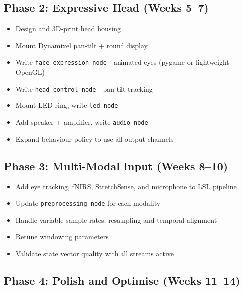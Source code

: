 \documentclass[11pt,a4paper]{article}
\begin{document}
\subsection{Phase 2: Expressive Head (Weeks 5--7)}

\begin{milestonebox}[title={Deliverable: Robot moves, looks at you, changes expression and LEDs based on state}]
\begin{itemize}[leftmargin=1.5em, nosep]
  \item Design and 3D-print head housing
  \item Mount Dynamixel pan-tilt + round display
  \item Write \texttt{face\_expression\_node}---animated eyes (pygame or lightweight OpenGL)
  \item Write \texttt{head\_control\_node}---pan-tilt tracking
  \item Mount LED ring, write \texttt{led\_node}
  \item Add speaker + amplifier, write \texttt{audio\_node}
  \item Expand behaviour policy to use all output channels
\end{itemize}
\end{milestonebox}

\subsection{Phase 3: Multi-Modal Input (Weeks 8--10)}

\begin{milestonebox}[title={Deliverable: Full multimodal input, richer state vector, nuanced behaviour}]
\begin{itemize}[leftmargin=1.5em, nosep]
  \item Add eye tracking, fNIRS, StretchSense, and microphone to LSL pipeline
  \item Update \texttt{preprocessing\_node} for each modality
  \item Handle variable sample rates: resampling and temporal alignment
  \item Retune windowing parameters
  \item Validate state vector quality with all streams active
\end{itemize}
\end{milestonebox}

\subsection{Phase 4: Polish and Optimise (Weeks 11--14)}
\end{document}
